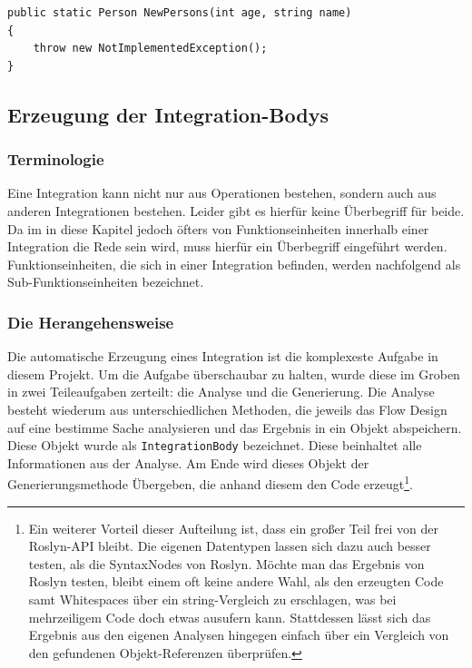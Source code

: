 	\begin{lstlisting}[caption=Mit Dexel generierter Code ]
public static Person NewPersons(int age, string name)
{
	throw new NotImplementedException();
}
	\end{lstlisting}
	 

\subsection{Erzeugung der Integration-Bodys}
\label{sec:orgheadline51}


	 \subsubsection{Terminologie}

	Eine Integration kann nicht nur aus
	Operationen bestehen, sondern auch aus anderen Integrationen bestehen.
	Leider gibt es hierfür keine Überbegriff für beide.
	Da im in diese Kapitel jedoch öfters von Funktionseinheiten innerhalb einer
	Integration die Rede sein wird, muss hierfür ein Überbegriff eingeführt
	werden. Funktionseinheiten, die sich in einer Integration befinden, werden
	nachfolgend als Sub-Funktionseinheiten bezeichnet.
	
	\subsubsection{Die Herangehensweise}

	
	Die automatische Erzeugung eines Integration ist die komplexeste Aufgabe in
	diesem Projekt. Um die Aufgabe überschaubar zu halten, wurde diese im Groben in
	zwei Teileaufgaben zerteilt: die Analyse und die Generierung.
	Die Analyse besteht wiederum aus unterschiedlichen Methoden, die jeweils das
	Flow Design auf eine bestimme Sache analysieren und das Ergebnis in ein Objekt
	abspeichern. Diese Objekt wurde als \texttt{IntegrationBody} bezeichnet.
	Diese beinhaltet alle Informationen aus der Analyse. Am Ende wird dieses Objekt
	der Generierungsmethode Übergeben, die anhand diesem den Code erzeugt\footnote{Ein weiterer Vorteil dieser Aufteilung ist, dass ein großer Teil frei von der Roslyn-API bleibt. Die eigenen Datentypen lassen sich dazu auch besser testen, als die SyntaxNodes von Roslyn. Möchte man das Ergebnis von Roslyn testen, bleibt einem  oft keine andere Wahl, als den erzeugten Code samt Whitespaces über ein string-Vergleich zu erschlagen, was bei mehrzeiligem Code doch etwas ausufern kann. Stattdessen lässt sich das Ergebnis aus den eigenen Analysen hingegen einfach über ein Vergleich von den gefundenen Objekt-Referenzen überprüfen.}.
	
